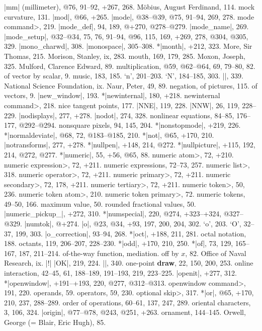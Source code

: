 |mm| (millimeter), @76, 91--92, +267, 268.
M\"obius, August Ferdinand, 114.
mock curvature, 131.
|mod|, @66, +265.
|mode|, @38--@39, @75, 91--94, 269, 278.
\<mode command>, 219.
|mode_def|, 94, 189, @+270, @278--@279.
|mode_name|, 269.
|mode_setup|, @32--@34, 75, 76, 91--94, @96, 115, 169, +269, 278, @304, @305,
 329.
|mono_charwd|, 308.
|monospace|, 305--308.
*|month|, +212, 323.
More, Sir Thomas, 215.
Morison, Stanley, ix, 283.
mouth, 169, 179, 285.
Moxon, Joseph, 325.
Mulford, Clarence Edward, 89.
multiplication, @59, @62--@64, 69, 79--80, 82.
\sub of vector by scalar, 9.
music, 183, 185.
\newletter
`n', 201--203.
`N', 184--185, 303.
|\names|, 339.
National Science Foundation, ix.
Naur, Peter, 49, 89.
negation, of pictures, 115.
\sub of vectors, 9.
|new_window|, 193.
*|newinternal|, 180, +218.
\<newinternal command>, 218.
nice tangent points, 177.
|NNE|, 119, 228.
|NNW|, 26, 119, 228--229.
|nodisplays|, 277, +278.
|nodot|, 274, 328.
nonlinear equations, 84--85, 176--177, @292--@294.
nonsquare pixels, 94, 145, 204.
*|nonstopmode|, +219, 226.
*|normaldeviate|, @68, 72, @183--@185, 210.
*|not|, @65, +170, 210.
|notransforms|, 277, +278.
*|nullpen|, +148, 214, @272.
*|nullpicture|, +115, 192, 214, @272, @277.
*|numeric|, 55, +56, @65, 88.
\<numeric atom>, 72, +210.
\<numeric expression>, 72, +211.
numeric expressions, 72--73, 257.
\<numeric list>, 318.
\<numeric operator>, 72, +211.
\<numeric primary>, 72, +211.
\<numeric secondary>, 72, 178, +211.
\<numeric tertiary>, 72, +211.
\<numeric token>, 50, 236.
\<numeric token atom>, 210.
\<numeric token primary>, 72.
numeric tokens, 49--50, 166.
\sub maximum value, 50.
\sub rounded fractional values, 50.
|numeric_pickup_|, +272, 310.
*|numspecial|, 220, @274, +323--+324, @327--@329.
|numtok|, @+274.
\newletter
|o|, @23, @34, +93, 197, 200, 204, 302.
`o', 203.
`O', 32--37, 199, 303.
|o_correction|, 93--94, 268.
*|oct|, +188, 211, 281.
octal notation, 188.
octants, 119, 206--207, 228--230.
*|odd|, +170, 210, 250.
*|of|, 73, 129, 165--167, 187, 211--214.
of-the-way function, \see mediation.
off by $x$, 82.
Office of Naval Research, ix.
|!| |OK|, 219, 224.
|\omitaccents|, 340.
one-point {\bf draw}, 22, 150, 200, 253.
online interaction, 42--45, 61, 188--189, 191--193, 219, 223--225.
|openit|, +277, 312.
*|openwindow|, +191--+193, 220, @277, @312--@313.
\<openwindow command>, 191, 220.
operands, 59.
operators, 59, 230.
\<optional skip>, 317.
*|or|, @65, +170, 210, 237, 288--289.
order of operations, 60--61, 137, 247, 289.
oriental characters, 3, 106, 324.
|origin|, @77--@78, @243, @251, +263.
ornament, 144--145.
Orwell, George (= Blair, Eric Hugh), 85.
